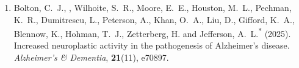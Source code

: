 \begin{enumerate}[resume=journalpubs]
\begin{pubentry}
\par\end{pubentry}
\item\begin{pubentry} Bolton, C.\ J., \PZnot{}, Wilhoite, S.\ R., Moore, E.\ E., Houston, M.\ L., Pechman, K.\ R., Dumitrescu, L., Peterson, A., Khan, O.\ A., Liu, D., Gifford, K.\ A., Blennow, K., Hohman, T.\ J., Zetterberg, H. and Jefferson, A.\ L.\textsuperscript{*} (2025). Increased neuroplastic activity in the pathogenesis of Alzheimer's disease. \emph{Alzheimer's \& Dementia}, \textbf{21}(11), e70897.
\par\end{pubentry}
\end{enumerate}
